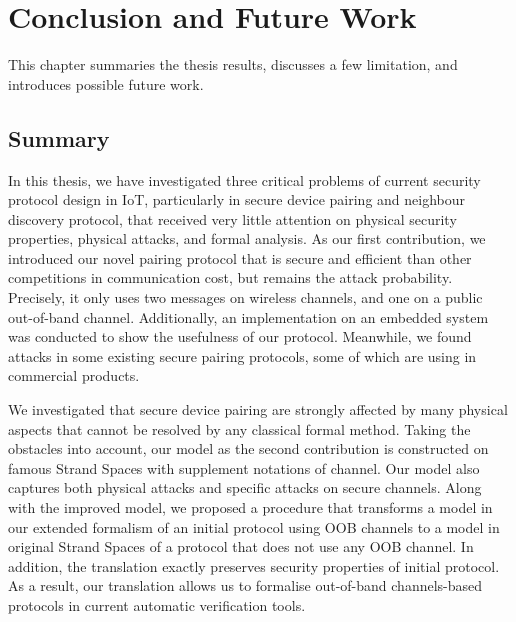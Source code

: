 
\chapter{Conclusion and Future Work} %

\label{Chapter6} %


This chapter summaries the thesis results, discusses a few limitation, and introduces possible future work. 

\section{Summary}

In this thesis, we have investigated three critical problems of current security protocol design in IoT, particularly in secure device pairing and neighbour discovery protocol, that received very little attention on physical security properties, physical attacks, and formal analysis. As our first contribution, we introduced our novel pairing protocol that is secure and efficient than other competitions in communication cost, but remains the attack probability. Precisely, it only uses two messages on wireless channels, and one on a public out-of-band channel. Additionally, an implementation on an embedded system was conducted to show the usefulness of our protocol. Meanwhile, we found attacks in some existing secure pairing protocols, some of which are using in commercial products. 

We investigated that secure device pairing are strongly affected by many physical aspects that cannot be resolved by any classical formal method. Taking the obstacles into account, our model as the second contribution is constructed on famous Strand Spaces with supplement notations of channel. Our model also captures both physical attacks and specific attacks on secure channels. Along with the improved model, we proposed a procedure that transforms a model in our extended formalism of an initial protocol using OOB channels to a model in original Strand Spaces of a protocol that does not use any OOB channel. In addition, the translation exactly preserves security properties of initial protocol. As a result, our translation allows us to formalise out-of-band channels-based protocols in current automatic verification tools. 

